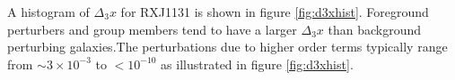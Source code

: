 A histogram of $\Delta_3 x$ for RXJ1131 is shown in figure \ref{fig:d3xhist}. Foreground perturbers and group members tend to have a larger $\Delta_3 x$ than background perturbing galaxies.The perturbations due to higher order terms typically range from $\sim 3 \times 10^{-3}$ to $<10^{-10}$ as illustrated in figure \ref{fig:d3xhist}.